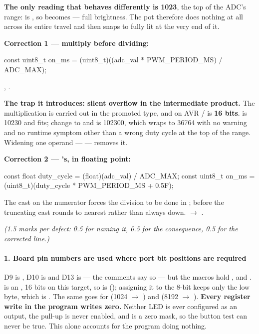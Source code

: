 \textbf{The only reading that behaves differently is 1023}, the top of the ADC's range:
 is , so  becomes  --- full brightness. The pot
therefore does nothing at all across its entire travel and then snaps to fully lit at the very end
of it. 

\textbf{Correction 1 --- multiply before dividing:}

\begin{ccode}
const uint8_t on_ms = (uint8_t)((adc_val * PWM_PERIOD_MS) / ADC_MAX);
\end{ccode}

\noindent{}, . 

\textbf{The trap it introduces: silent overflow in the intermediate product.} The multiplication
is carried out in the promoted type, and on AVR / is \textbf{16 bits}.
 is 10230 and fits; change  to  and
 is 102300, which wraps to 36764 with no warning and no runtime symptom other than
a wrong duty cycle at the top of the range. Widening one operand ---
 --- removes it. 

\textbf{Correction 2 --- 's, in floating point:}

\begin{ccode}
const float duty_cycle = (float)(adc_val) / ADC_MAX;
const uint8_t on_ms    = (uint8_t)(duty_cycle * PWM_PERIOD_MS + 0.5F);
\end{ccode}

\noindent The cast on the numerator forces the division to be done in ;
 before the truncating cast rounds to nearest rather than always down.
 $\rightarrow$ . 


\textit{(1.5 marks per defect: 0.5 for naming it, 0.5 for the consequence, 0.5 for the corrected
line.)}

\paragraph{1. Board pin numbers are used where port bit positions are required}
D9 is , D10 is  and D13 is  --- the comments say so --- but
the macros hold ,  and .  is an , 16 bits
on this target, so  is  (); assigning it to the 8-bit
 keeps only the low byte, which is . The same goes for 
(1024 $\rightarrow$ ) and  (8192 $\rightarrow$ ).
\textbf{Every register write in the program writes zero.} Neither LED is ever configured as an
output, the pull-up is never enabled, and  is a zero mask, so the button test can
never be true. This alone accounts for the program doing nothing.

